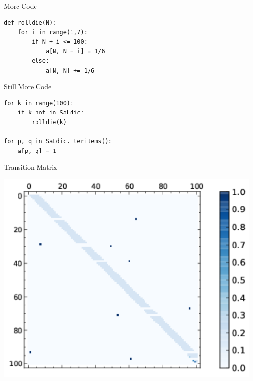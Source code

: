 \documentclass{beamer}
\begin{document}
\begin{frame}[fragile]{More Code}
  \begin{verbatim}
def rolldie(N):
    for i in range(1,7):
        if N + i <= 100:
            a[N, N + i] = 1/6
        else:
            a[N, N] += 1/6
  \end{verbatim}
\end{frame}

\begin{frame}[fragile]{Still More Code}
  \begin{verbatim}
for k in range(100):
    if k not in SaLdic:
        rolldie(k)

for p, q in SaLdic.iteritems():
    a[p, q] = 1
  \end{verbatim}
\end{frame}

\begin{frame}{Transition Matrix}
    \begin{center}
      \includegraphics[scale=0.8]{images/matplot}
    \end{center}
\end{frame}
\end{document}
